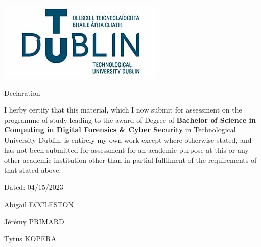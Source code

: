 \documentclass[../main.tex]{subfiles}
\begin{document}
\begin{PageVierge}

	\includegraphics[height=0.25\textwidth]{tu_dublin_logo.jpg}

    {
	    \fontsize{20}{18} 
	    \selectfont
	    \bf

        Declaration
    }


	\vspace{2.5cm}


    I herby certify that this material, which I now submit for assessment on the programme of study leading to the award of Degree of \textbf{Bachelor of Science in Computing in Digital Forensics \& Cyber Security} in Technological University Dublin, is entirely my own work except where otherwise stated, and has not been submitted for assessment for an academic purpose at this or any other academic institution other than in partial fulfilment of the requirements of that stated above.




	\vspace{1cm}

	Dated: 04/15/2023


	\begin{flushright}

        Abigail ECCLESTON

        Jérémy PRIMARD
        
        Tytus KOPERA

	\end{flushright}


\end{PageVierge}
\end{document}

